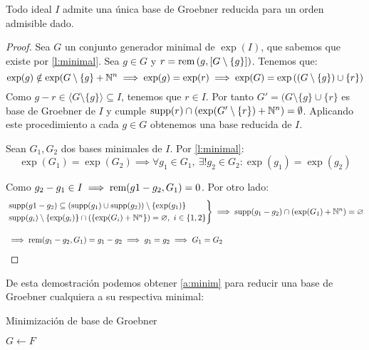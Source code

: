 \begin{teorema}
    Todo ideal $I$ admite una única base de Groebner reducida para un orden admisible dado.
\end{teorema}
\begin{proof}
     Sea $G$ un conjunto generador minimal de $\exp(I)$, que sabemos que existe por \autoref{l:minimal}. Sea $g\in G$ y $r = \text{rem}\left(g, [G\setminus \{g\}]\right)$. Tenemos que:
    \begin{equation*}
        \exp(g) \notin \exp(G\setminus\{g\} + \mathbb{N}^n \implies \exp(g)=\exp(r) \implies \exp(G) = \exp\left( (G\setminus \{g\})\cup \{r\}\right)
    \end{equation*}
    Como $g-r\in \langle G\setminus \{g\} \rangle \subseteq I$, tenemos que $r\in I$. Por tanto $G' = (G\setminus \{g\} \cup \{r\}$ es base de Groebner de $I$ y cumple $\text{supp}(r) \cap \left(\exp(G'\setminus\{r\}) + \mathbb{N}^n \right) = \emptyset$.
    Aplicando este procedimiento a cada $g\in G$ obtenemos una base reducida de $I$.\newline

     Sean $G_1,G_2$ dos bases minimales de $I$. Por \autoref{l:minimal}:
    \begin{equation*}
        \exp(G_1) = \exp(G_2) \implies \forall g_1\in G_1,\ \exists! g_2\in G_2 : \exp(g_1) = \exp(g_2)
    \end{equation*}

    Como $g_2 - g_1 \in I \implies \text{rem}(g1-g_2, G_1) = 0$. Por otro lado:
    \begin{align*}        
    &\begin{rcases}
        \text{supp}(g1-g_2) \subseteq \left( \text{supp}(g_1)\cup \text{supp}(g_2) \right) \setminus \{\exp(g_1)\}\\
        \text{supp}(g_i)\setminus \{\exp(g_i)\}\cap \left(\{\exp(G_i) + \mathbb{N}^n\}\right) = \varnothing,\ i\in\{1,2\}
    \end{rcases} \implies \text{supp}(g_1-g_2) \cap \left(\exp(G_1)+\mathbb{N}^n\right) = \varnothing\\[10pt]
    &\implies \text{rem}(g_1-g_2, G_1) = g_1-g_2 \implies g_1=g_2 \implies G_1 = G_2
    \end{align*}
\end{proof}

De esta demostración podemos obtener \autoref{a:minim} para reducir una base de Groebner cualquiera a su respectiva minimal:
\begin{algorithm}[hbt!]
    \caption{Minimización de base de Groebner}\label{a:minim}

    $G\gets F$\;

\end{algorithm}



